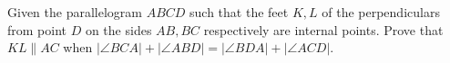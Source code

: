 Given the parallelogram $ABCD$ such that the feet $K, L$ of the perpendiculars from point $D$ on the sides $AB, BC$ respectively are internal points. Prove that $KL \parallel AC$ when $|\angle BCA| + |\angle ABD| = |\angle BDA| + |\angle ACD|$.
